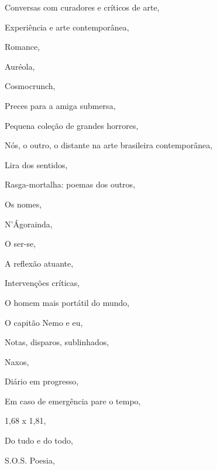 \begin{multicols}{2}
\begin{enumerate}
{\item Conversas com curadores e críticos de arte, {}
\item Experiência e arte contemporânea,  {}
\item Romance, {}
\item Auréola, {}
\item Cosmocrunch, {}
\item Preces para a amiga submersa, {}
\item Pequena coleção de grandes horrores, {}
\item Nós, o outro, o distante na arte brasileira contemporânea, {}
\item Lira dos sentidos, {}
\item Rasga-mortalha: poemas dos outros, {}
\item Os nomes, {}
\item N’Ágorainda, {}
\item O ser-se, {}
\item A reflexão atuante, {}
\item Intervenções críticas, {}
\item O homem mais portátil do mundo, {}
\item O capitão Nemo e eu, {}
\item Notas, disparos, sublinhados, {}
\item Naxos, {}
\item Diário em progresso, {}
\item Em caso de emergência pare o tempo, {}
\item 1,68 x 1,81, {}
\item Do tudo e do todo, {}
\item S.O.S. Poesia, {}
}
\end{enumerate}
\end{multicols}

